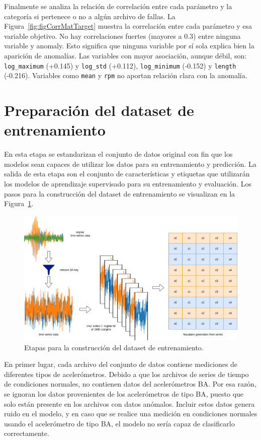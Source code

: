\documentclass[11pt,a4paper,spanish]{book}
\numberwithin{equation}{chapter}
\numberwithin{figure}{chapter}
\begin{document}
Finalmente se analiza la relación de correlación entre cada parámetro y la categoría si pertenece o no a algún archivo de fallas. La Figura~\ref{fig:figCorrMatTarget} muestra la correlación entre cada parámetro y esa variable objetivo. No hay correlaciones fuertes (mayores a 0.3) entre ninguna variable y anomaly. 
Esto significa que ninguna variable por sí sola explica bien la aparición de anomalías. 
Las variables con mayor asociación, aunque débil, son: \lstinline|log_maximum| (+0.145) y \lstinline|log_std| (+0.112), \lstinline|log_minimum| (-0.152) y \lstinline|length| (-0.216).
Variables como \lstinline|mean| y \lstinline|rpm| no aportan relación clara con la anomalía.



\section{Preparación del dataset de entrenamiento}

En esta etapa se estandarizan el conjunto de datos original con fin que los modelos sean capaces de utilizar los datos para su entrenamiento y predicción. La salida de esta etapa son el conjunto de características y etiquetas que utilizarán los modelos de aprendizaje supervisado para su entrenamiento y evaluación. Los pasos para la construcción del dataset de entrenamiento se visualizan en la Figura~\ref{fig:figGenerationDataset}.


\begin{figure}[h]
    \centering
    \includegraphics[width=1\textwidth]{media/generacion-dataset.drawio.png}
    \caption{Etapas para la construcción del dataset de entrenamiento.}
    \label{fig:figGenerationDataset}
\end{figure}


En primer lugar, cada archivo del conjunto de datos contiene mediciones de diferentes tipos de acelerómetros. Debido a que los archivos de series de tiempo de condiciones normales, no contienen datos del acelerómetros BA. Por esa razón, se ignoran los datos provenientes de los acelerómetros de tipo BA, puesto que solo están presente en los archivos con datos anómalos. Incluir estos datos genera ruido en el modelo, y en caso que se realice una medición en condiciones normales usando el acelerómetro de tipo BA, el modelo no sería capaz de clasificarlo correctamente.
\end{document}
